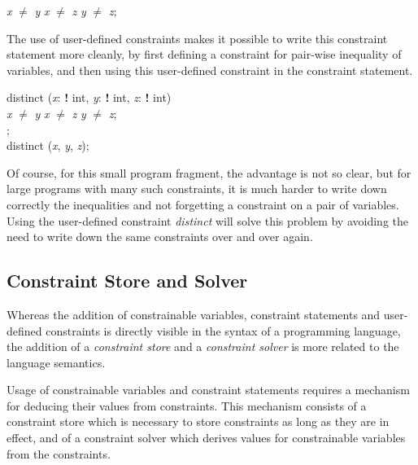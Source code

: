 \begin{ttlprog}
\>\ttlRequire{} {\em x} $\neq$ {\em y} \ttlAnd{} {\em x} $\neq$ {\em z} \ttlAnd{} {\em y} $\neq$ {\em z};
\end{ttlprog}

\noindent
The use of user-defined constraints makes it possible to write this
constraint statement more cleanly, by first defining a constraint for
pair-wise inequality of variables, and then using this user-defined
constraint in the constraint statement.

\begin{ttlprog}
\>\ttlConstraint{} distinct ({\em x}: {\bf!} int, {\em y}: {\bf!} int, {\em z}: {\bf!} int)\\
\>\>\ttlRequire{} {\em x} $\neq$ {\em y} \ttlAnd{} {\em x} $\neq$ {\em z} \ttlAnd{} {\em y} $\neq$ {\em z};\\
\>\ttlEnd{};\\
\>\ttlRequire{} distinct ({\em x}, {\em y}, {\em z});
\end{ttlprog}

\noindent
Of course, for this small program fragment, the advantage is not so
clear, but for large programs with many such constraints, it is much
harder to write down correctly the inequalities and not forgetting a
constraint on a pair of variables.  Using the user-defined constraint
{\em distinct} will solve this problem by avoiding the need to write
down the same constraints over and over again.

\subsection{Constraint Store and Solver}
\label{sec:store-and-solver}

Whereas the addition of constrainable variables, constraint statements
and user-defined constraints is directly visible in the syntax of a
programming language, the addition of a {\em constraint store} and a
{\em constraint solver} is more related to the language semantics.

Usage of constrainable variables and constraint statements requires a
mechanism for deducing their values from constraints.  This mechanism
consists of a constraint store which is necessary to store constraints
as long as they are in effect, and of a constraint solver which
derives values for constrainable variables from the constraints.

